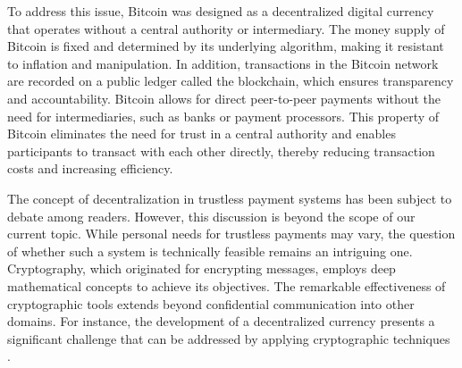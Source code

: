 To address this issue, Bitcoin was designed as a decentralized digital currency that operates without a central authority or intermediary. The
money supply of Bitcoin is fixed and determined by its underlying algorithm, making it resistant to inflation and manipulation. In addition,
transactions in the Bitcoin network are recorded on a public ledger called the blockchain, which ensures transparency and accountability.
Bitcoin allows for direct peer-to-peer payments without the need for intermediaries, such as banks or payment processors. This property of
Bitcoin eliminates the need for trust in a central authority and enables participants to transact with each other directly, thereby reducing
transaction costs and increasing efficiency.

The concept of decentralization in trustless payment systems has been subject to debate among readers. However, this discussion is beyond the
scope of our current topic. While personal needs for trustless payments may vary, the question of whether such a system is technically feasible
remains an intriguing one. Cryptography, which originated for encrypting messages, employs deep mathematical concepts to achieve its objectives.
The remarkable effectiveness of cryptographic tools extends beyond confidential communication into other domains. For instance, the development
of a decentralized currency presents a significant challenge that can be addressed by applying cryptographic techniques \cite{diffie2022new}.
